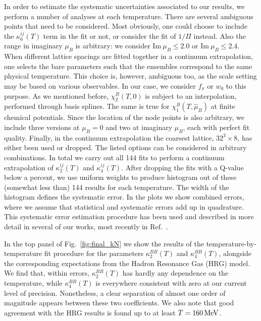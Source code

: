 \documentclass[aps,prd,twocolumn,superscriptaddress]{revtex4-2}
\newcommand \hmu {\hat{\mu}}
\newcommand{\MeV}{\, {\rm MeV}}
\begin{document}
In order to estimate the systematic uncertainties 
associated to our results, we perform a number
of analyses at each temperature.
There are several ambiguous points that need to be considered.
Most obviously, one could choose to include the $\kappa_6^{ij}(T)$
term in the fit or not,
or consider the fit of $1/\Pi$ instead.
Also the range in imaginary $\mu_B$ is arbitrary: we
consider $\mathrm{Im}~\mu_B\le 2.0$ or $\mathrm{Im}~\mu_B\le 2.4$.
When different lattice spacings are fitted together in a continuum
extrapolation, one selects the bare parameters such that the ensembles
correspond to the same physical temperature. This choice is, however,
ambiguous too, as the scale setting may be based on various observables. In
our case, we consider $f_\pi$ or $w_0$ to this purpose. As we mentioned before, 
$\chi^B_2(T,0)$ is subject to an interpolation, performed through basis splines. The 
same is true for $\chi^B_1(T,\hmu_B)$ at finite chemical potentials. Since the location 
of the node points is also arbitrary, we include three versions at $\mu_B=0$ and two 
at imaginary $\mu_B$, each with perfect fit quality. Finally, in the continuum 
extrapolation the coarsest lattice, $32^3\times8$, has either been used or dropped.
The listed options can be considered in arbitrary combinations. In total
we carry out all 144 fits to perform a continuum extrapolation of $\kappa_2^{ij}(T)$ 
and $\kappa_4^{ij}(T)$. After dropping the fits with a Q-value below a percent,
we use uniform weights to produce histogram out of these (somewhat less than)
144 results for each temperature. The width of the histogram defines
the systematic error. In the plots we show combined errors, where we assume
that statistical and systematic errors add up in quadrature.
This systematic error estimation procedure has been used and described
in more detail in several of our works, most recently in
Ref.~\cite{Borsanyi:2018grb}.

In the top panel of Fig.~\ref{fig:final_kN} we show the results
of the temperature-by-temperature fit procedure for the 
parameters $\kappa_2^{BB} (T)$ and $\kappa_4^{BB} (T)$, alongside
the corresponding expectations from the Hadron Resonance Gas (HRG) model. 
We find that, within errors, $\kappa_2^{BB}(T)$ has hardly any dependence on
the temperature, while $\kappa_4^{BB} (T)$ is everywhere consistent with zero
at our current level of precision. Nonetheless, a clear separation of almost
one order of magnitude appears between these two coefficients. We also note
that good agreement with the HRG results is found up to at least $T=160\MeV$.
\end{document}
